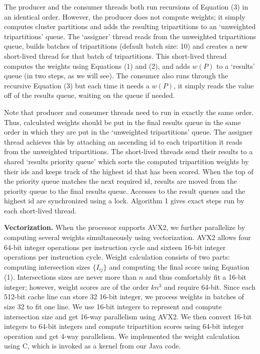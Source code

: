 \documentclass[12pt]{article}
\begin{document}
The producer and the consumer threads both run recursions of Equation (3) in an identical order. However, the producer does not compute weights; it simply computes cluster partitions and adds the resulting tripartitions to an `unweighted tripartitions' queue. The `assigner' thread reads from the unweighted tripartitions queue, builds batches of tripartitions (default batch size: 10) and creates a new short-lived thread for that batch of tripartitions. This short-lived thread computes the weights using Equations (1) and (2), and adds $w(P)$ to a `results' queue (in two steps, as we will see). The consumer also runs through the recursive Equation (3) but each time it needs a $w(P)$, it simply reads the value off of the results queue, waiting on the queue if needed.

Note that producer and consumer threads need to run in exactly the same order. Thus, calculated weights should be put in the final results queue in the same order in which they are put in the `unweighted tripartitions' queue. The assigner thread achieves this by attaching an ascending id to each tripartition it reads from the unweighted tripartitions. The short-lived threads send their results to a shared `results priority queue' which sorts the computed tripartition weights by their ids and keeps track of the highest id that has been scored. When the top of the priority queue matches the next required id, results are moved from the priority queue to the final results queue. Accesses to the result queues and the highest id are synchronized using a lock. Algorithm 1 gives exact steps run by each short-lived thread.

\textbf{Vectorization.} When the processor supports AVX2, we further parallelize by computing several weights simultaneously using vectorization. AVX2 allows four 64-bit integer operations per instruction cycle and sixteen 16-bit integer operations per instruction cycle. Weight calculation consists of two parts: computing intersection sizes $\{I_{i j}\}$ and computing the final score using Equation (1). Intersections sizes are never more than $n$ and thus comfortably fit a 16-bit integer; however, weight scores are of the order $k n^3$ and require 64-bit. Since each 512-bit cache line can store 32 16-bit integer, we process weights in batches of size 32 to fit one line. We use 16-bit integers to represent and compute intersection size and get 16-way parallelism using AVX2. We then convert 16-bit integers to 64-bit integers and compute tripartition scores using 64-bit integer operation and get 4-way parallelism. We implemented the weight calculation using C, which is invoked as a kernel from our Java code.
\end{document}

